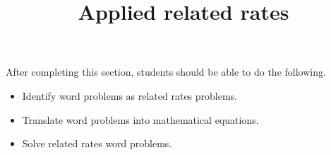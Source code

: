 \documentclass{ximera}
\title{Applied related rates}
\begin{document}
\begin{abstract}
\end{abstract}

\maketitle

\begin{sectionOutcomes}

After completing this section, students should be able to do the following.

\begin{itemize}
\item Identify word problems as related rates problems.
\item Translate word problems into mathematical equations.
\item Solve related rates word problems.

\end{itemize}

\end{sectionOutcomes}
\end{document}

